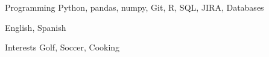 

\begin{cvskills}

  \cvskill
    {Programming} %
    {Python, pandas, numpy, Git, R, SQL, JIRA, Databases} %

 {English, Spanish}

  \cvskill
  {Interests}
  {Golf, Soccer, Cooking}

\end{cvskills}
